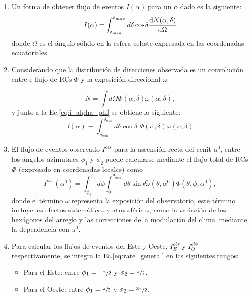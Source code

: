 \begin{enumerate}


    \item Un forma de obtener flujo de eventos $I(\alpha)$  para un $\alpha$ dado es la siguiente:
        \begin{equation}
            I(\alpha) = \int_{\delta_{min}}^{\delta_{max}} d\delta \cos \delta \dv{N(\alpha,\delta)}{\Omega}
            \label{eq:i_alpha_phi}
        \end{equation}
    \noindent donde $\Omega$ es el ángulo sólido en la esfera celeste expresada en las coordenadas ecuatoriales.

    \item Considerando que la distribución de direcciones observada es un convolución entre e flujo de RCs $\Phi$ y la exposición direccional $\omega$:
    
        \begin{equation}
            \tilde{N} = \int d\Omega \Phi(\alpha, \delta) \omega(\alpha, \delta),
            \label{eq:conv}
        \end{equation}
    \noindent y junto a la Ec.\ref{eq:i_alpha_phi}  se obtiene lo siguiente:
    \begin{equation}
        I(\alpha) =  \int_{\delta_{min}}^{\delta_{max}} d\delta \cos\delta \,\, \Phi(\alpha, \delta) \omega(\alpha, \delta)
        \label{eq:i_coor_ecua}
    \end{equation}


    \item El flujo de eventos observado $I^{obs}$ para la ascensión recta del cenit $\alpha^0$, entre los ángulos azimutales $\phi_1$ y $\phi_2$ puede calcularse mediante el flujo total de RCs $\Phi$ (expresado en coordenadas locales) como
    \begin{equation}
        I^{obs}(\alpha^0) = \int_{\phi_1}^{\phi_2} d\phi \int_{0}^{\theta_{max}} d\theta \sin\theta \tilde{\omega}(\theta, \alpha^0) \Phi(\theta, \phi, \alpha^0),
        \label{eq:rate_general}
    \end{equation}
    \noindent  donde  el término $\tilde{\omega}$ representa la exposición del observatorio, este término incluye los efectos sistemáticos y atmosféricos, como la variación de los hexágonos del arreglo y las correcciones de la modulación del clima, mediante  la dependencia con $\alpha^0$.

    \item Para calcular los flujos de eventos del Este y Oeste, $I^{obs}_E$ y $I_O^{obs}$ respectivamente, se integra la Ec.\ref{eq:rate_general} en los siguientes  rangos:
    \begin{itemize}
        \item Para el Este: entre $\phi_1=\nicefrac{-\pi}{2}$ y $\phi_2=\nicefrac{\pi}{2}$.
        \item Para el Oeste: entre $\phi_1=\nicefrac{\pi}{2}$ y $\phi_2=\nicefrac{3\pi}{2}$.
    \end{itemize}


\end{enumerate}
